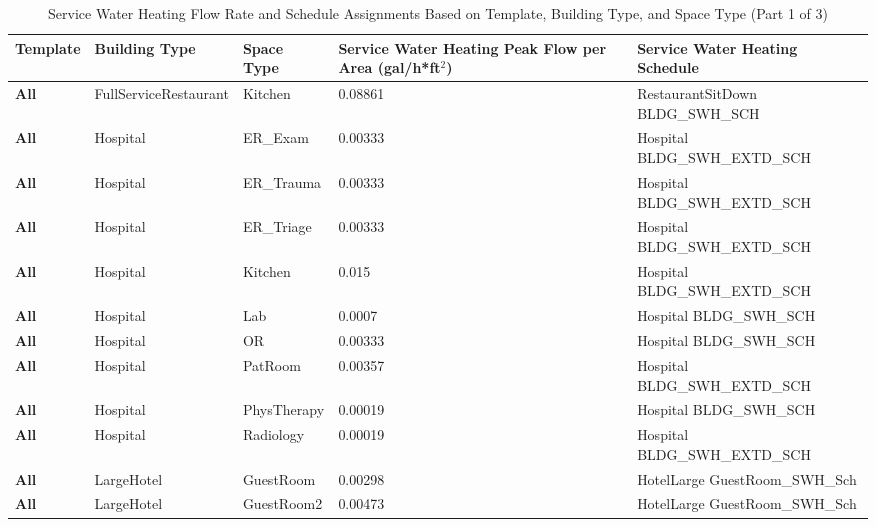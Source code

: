 \begin{table}
\centering
\small
\caption[Service Water Heating Flow Rate and Schedules Part 1]{Service Water Heating Flow Rate and Schedule Assignments Based on Template, Building Type, and Space Type (Part 1 of 3)}
\label{tab:swh_flow_rates_p1}
\begin{tabular}{|p{3cm}|p{3cm}|p{3cm}|p{3cm}|p{3cm}|}
\hline
\textbf{Template} &
  \textbf{Building Type} &
  \textbf{Space Type} &
  \textbf{Service Water   Heating Peak Flow per Area (gal/h*ft$^2$)} &
  \textbf{Service Water   Heating Schedule} \\ \hline
\textbf{All}                     & FullServiceRestaurant & Kitchen     & 0.08861 & RestaurantSitDown   BLDG\_SWH\_SCH           \\ \hline
\textbf{All}                     & Hospital              & ER\_Exam    & 0.00333 & Hospital   BLDG\_SWH\_EXTD\_SCH              \\ \hline
\textbf{All}                     & Hospital              & ER\_Trauma  & 0.00333 & Hospital   BLDG\_SWH\_EXTD\_SCH              \\ \hline
\textbf{All}                     & Hospital              & ER\_Triage  & 0.00333 & Hospital   BLDG\_SWH\_EXTD\_SCH              \\ \hline
\textbf{All}                     & Hospital              & Kitchen     & 0.015   & Hospital   BLDG\_SWH\_EXTD\_SCH              \\ \hline
\textbf{All}                     & Hospital              & Lab         & 0.0007  & Hospital BLDG\_SWH\_SCH                      \\ \hline
\textbf{All}                     & Hospital              & OR          & 0.00333 & Hospital BLDG\_SWH\_SCH                      \\ \hline
\textbf{All}                     & Hospital              & PatRoom     & 0.00357 & Hospital   BLDG\_SWH\_EXTD\_SCH              \\ \hline
\textbf{All}                     & Hospital              & PhysTherapy & 0.00019 & Hospital BLDG\_SWH\_SCH                      \\ \hline
\textbf{All}                     & Hospital              & Radiology   & 0.00019 & Hospital   BLDG\_SWH\_EXTD\_SCH              \\ \hline
\textbf{All}                     & LargeHotel            & GuestRoom   & 0.00298 & HotelLarge   GuestRoom\_SWH\_Sch             \\ \hline
\textbf{All}                     & LargeHotel            & GuestRoom2  & 0.00473 & HotelLarge   GuestRoom\_SWH\_Sch             \\ \hline

\end{tabular}
\end{table}
